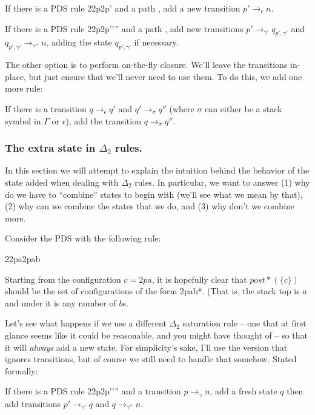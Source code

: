 \documentclass{article}
\newcommand{\config}{2}{\ensuremath{\langle #1, #2 \rangle}}
\newcommand{\rule}{2}{\ensuremath{#1 \righthookarrow #2}}
\newcommand{\trans}[3]{\ensuremath{#1 \rightarrow_{#2} #3}}
\begin{document}
\begin{defintion}
   If there is a PDS rule
   \rule{\config{p}{\gamma}}{\config{p'}{\epsilon}} and a path
   , add a new transition
   \trans{p'}{\epsilon}{n}.

   If there is a PDS rule
   \rule{\config{p}{\gamma}}{\config{p'}{\gamma'\gamma''}} and a path
   , add new transitions
   \trans{p'}{\gamma'}{q_{p',\gamma'}} and
   \trans{q_{p',\gamma'}}{\gamma''}{n}, adding the state
   $q_{p',\gamma'}$ if necessary.


The other option is to perform on-the-fly \epsilon closure. We'll
leave the \epsilon transitions in-place, but just ensure that we'll
never need to use them. To do this, we add one more rule:

    If there is a transition \trans{q}{\epsilon}{q'} and
    \trans{q'}{\sigma}{q''} (where $\sigma$ can either be a stack
    symbol in $\Gamma$ or $\epsilon$), add the transition
    \trans{q}{\sigma}{q''}.


\subsubsection{The extra state in $\Delta_2$ rules.}

In this section we will attempt to explain the intuition behind the
behavior of the state added when dealing with $\Delta_2$ rules.  In
particular, we want to answer (1) why do we have to ``combine'' states
to begin with (we'll see what we mean by that), (2) why can we combine
the states that we do, and (3) why don't we combine more.


Consider the PDS with the following rule:

  \rule{\config{p}{a}}{\config{p}{ab}}

Starting from the configuration $c = \config{p}{a}$, it is hopefully
clear that $post*(\{c\})$ should be the set of configurations of the
form \config{p}{ab*}. (That is, the stack top is $a$ and under it is
any number of $b$s.

Let's see what happens if we use a different $\Delta_2$ saturation
rule -- one that at first glance seems like it could be reasonable,
and you might have thought of -- so that it will \emph{always} add a
new state. For simplicity's sake, I'll use the version that ignores
\epsilon transitions, but of course we still need to handle that
somehow. Stated formally:

   If there is a PDS rule
   \rule{\config{p}{\gamma}}{\config{p'}{\gamma'\gamma''}} and a
   transition \trans{p}{\gamma}{n}, add a fresh state $q$ then add
   transitions \trans{p'}{\gamma'}{q} and \trans{q}{\gamma''}{n}.


\end{defintion}
\end{document}
